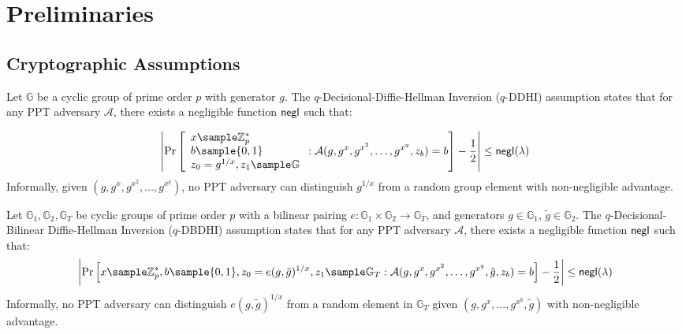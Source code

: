 \section{Preliminaries}\label{sec-vrf-preliminaries}

\subsection{Cryptographic Assumptions}

\begin{definition}
Let $\mathbb{G}$ be a cyclic group of prime order $p$ with generator $g$. The $q$-Decisional-Diffie-Hellman Inversion ($q$-DDHI) \cite{mitsunari_new_2002} assumption states that for any PPT adversary $\mathcal{A}$, there exists a negligible function $\mathsf{negl}$ such that:

\[
\left| \Pr\left[
\begin{array}{l}
x \sample \Zp^* \\
 b \sample \{0,1\} \\
 z_0 = g^{1/x}, z_1 \sample \G \\ 
\end{array}
: \mathcal{A}(g, g^x, g^{x^2}, \ldots, g^{x^q}, z_b) = b \right] - \frac{1}{2}\right| \leq \negl(\lambda)
\]
Informally, given $(g, g^x, g^{x^2}, \ldots, g^{x^q})$, no PPT adversary can distinguish $g^{1/x}$ from a random group element with non-negligible advantage.
\end{definition}


\begin{definition}
Let $\mathbb{G}_1, \mathbb{G}_2, \mathbb{G}_T$ be cyclic groups of prime order $p$ with a bilinear pairing $e: \mathbb{G}_1 \times \mathbb{G}_2 \to \mathbb{G}_T$, and generators $g \in \mathbb{G}_1$, $\tilde{g} \in \mathbb{G}_2$. The $q$-Decisional-Bilinear Diffie-Hellman Inversion ($q$-DBDHI) assumption states that for any PPT adversary $\mathcal{A}$, there exists a negligible function $\mathsf{negl}$ such that:
\[
\left| \Pr\left[ x \sample \Z_p^*, b \sample \{0,1\}, z_0 = e(g, \tilde{g})^{1/x}, z_1 \sample \G_T : \mathcal{A}(g, g^x, g^{x^2}, \ldots, g^{x^q}, \tilde{g}, z_b) = b \right] - \frac{1}{2}\right| \leq \negl(\lambda)
\]
Informally, no PPT adversary can distinguish $e(g, \tilde{g})^{1/x}$ from a random element in $\mathbb{G}_T$ given $(g, g^x, \ldots, g^{x^q}, \tilde{g})$ with non-negligible advantage.
\end{definition}




